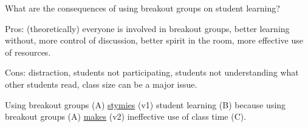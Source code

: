 \documentclass[12pt]{article}
\begin{document}
What are the consequences of using breakout groups on student learning?

Pros: (theoretically) everyone is involved in breakout groups, better learning without, more control of discussion, better spirit in the room, more effective use of resources.

Cons: distraction, students not participating, students not understanding what other students read, class size can be a major issue.

Using breakout groups (A) \uline{stymies} (v1) student learning (B) because using breakout groups (A) \uline{makes} (v2) ineffective use of class time (C).

\end{document}
